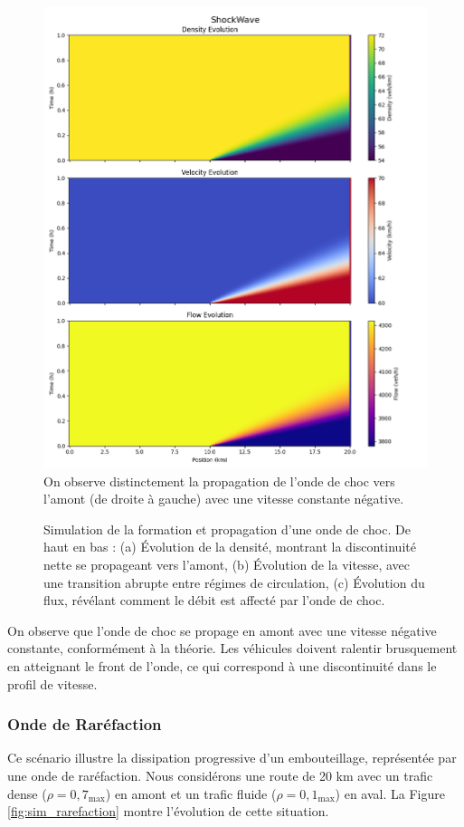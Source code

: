 \begin{figure}[htbp]
\centering
\includegraphics[width=1.0\textwidth]{simulations/LWR/shock/shockwave.png}On observe distinctement la propagation de l'onde de choc vers l'amont (de droite à gauche) avec une vitesse constante négative.
\caption{Simulation de la formation et propagation d'une onde de choc. De haut en bas : (a) Évolution de la densité, montrant la discontinuité nette se propageant vers l'amont, (b) Évolution de la vitesse, avec une transition abrupte entre régimes de circulation, (c) Évolution du flux, révélant comment le débit est affecté par l'onde de choc.}
\label{fig:sim_onde_choc}
\end{figure}
On observe que l'onde de choc se propage en amont avec une vitesse négative constante, conformément à la théorie. Les véhicules doivent ralentir brusquement en atteignant le front de l'onde, ce qui correspond à une discontinuité dans le profil de vitesse.

\subsubsection{Onde de Raréfaction}
\label{subsubsec:rarefaction_sim}
Ce scénario illustre la dissipation progressive d'un embouteillage, représentée par une onde de raréfaction. Nous considérons une route de 20 km avec un trafic dense ($\rho = 0,7$\rho$_{\max}$) en amont et un trafic fluide ($\rho = 0,1$\rho$_{\max}$) en aval. La Figure \ref{fig:sim_rarefaction} montre l'évolution de cette situation.


